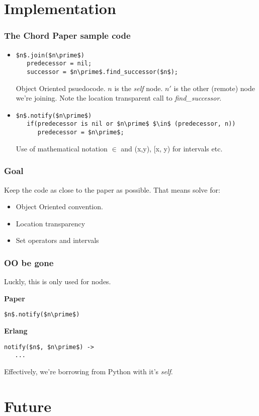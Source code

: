 \documentclass{beamer}
\begin{document}
\section{Implementation}
\begin{frame}[fragile]
  \frametitle{The Chord Paper sample code}
  \begin{itemize}
  \item
    \begin{lstlisting}[mathescape, style=pesudocode]
$n$.join($n\prime$)
   predecessor = nil;
   successor = $n\prime$.find_successor($n$);
    \end{lstlisting}
    Object Oriented psuedocode. \emph{$n$} is the \emph{self}
    node. \emph{$n\prime$} is the other (remote) node we're
    joining. Note the location transparent call to
    \emph{find\_successor}.

  \item 
    \begin{lstlisting}[mathescape, style=pesudocode]
$n$.notify($n\prime$)
   if(predecessor is nil or $n\prime$ $\in$ (predecessor, n))
      predecessor = $n\prime$;
    \end{lstlisting}
    Use of mathematical notation $\in$ and (x,y), [x, y) for intervals
      etc.
  \end{itemize}
\end{frame}

\begin{frame}
  \frametitle{Goal} Keep the code as close to the paper as
  possible. That means solve for:
  \begin{itemize}
  \item Object Oriented convention.
  \item Location transparency
  \item Set operators and intervals
  \end{itemize}
\end{frame}

\begin{frame}[fragile]
  \frametitle{OO be gone}
  Luckly, this is only used for nodes.

  \begin{multicols}{2}
    \textbf{Paper}
   \begin{lstlisting}[mathescape, style=pesudocode]
$n$.notify($n\prime$)
    \end{lstlisting}

   \columnbreak

   \textbf{Erlang}
    \begin{lstlisting}[mathescape, style=erlang]
notify($n$, $n\prime$) ->
   ...
    \end{lstlisting}
  \end{multicols}

  Effectively, we're borrowing from Python with it's \emph{self}.
   
\end{frame}

\section{Future}
\end{document}
